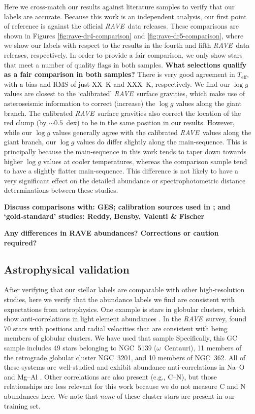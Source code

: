 \documentclass[preprint,trackchanges]{aastex}
\newcommand{\acronym}[1]{{\small{#1}}}
\newcommand{\project}[1]{\textsl{#1}}
\newcommand{\rave}{\project{\acronym{RAVE}}}
\newcommand{\stub}[1]{{\color{blue} \textbf{#1}}}
\newcommand{\teff}{T_{\mathrm{eff}}}
\newcommand{\logg}{\log g}
\begin{document}
Here we cross-match our results against literature samples to verify that
our labels are accurate.  Because this work is an independent analysis, our
first point of reference is against the official \rave\ data releases.  These
comparisons are shown in Figures \ref{fig:rave-dr4-comparison} and 
\ref{fig:rave-dr5-comparison}, where we show our labels with respect to the
results in the fourth and fifth \rave\ data releases, respectively.  In order
to provide a fair comparison, we only show stars that meet a number of quality
flags in both samples. 
\stub{What selections qualify as a fair comparison in both samples?}
There is very good agreement in $\teff$, with a bias
and RMS of just XX~K and XXX~K, respectively.  We find our $\logg$ values are
closest to the `calibrated' \rave\ surface gravities, which make use of 
asteroseismic information to correct (increase) the $\logg$ values along the
giant branch.  The calibrated \rave\ surface gravities also correct the 
location of the red clump (by $\sim0.5$~dex) to be in the same position in our
results.  However, while our $\logg$ values generally agree with the calibrated
\rave\ values along the giant branch, our $\logg$ values do differ slightly 
along the main-sequence.  This is principally because the main-sequence in 
this work tends to taper down towards higher $\logg$ values at cooler 
temperatures, whereas the comparison sample tend to have a slightly flatter
main-sequence.  This difference is not likely to have a very significant 
effect on the detailed abundance or spectrophotometric distance determinations
between these studies.

\stub{Discuss comparisons with: GES; calibration sources used in \citet{Kordopatis_2013}; and `gold-standard' studies: Reddy, Bensby, Valenti \& Fischer}

\stub{Any differences in RAVE abundances? Corrections or caution required?}


\subsection{Astrophysical validation}
\label{sec:astrophysical-validation}


After verifying that our stellar labels are comparable with other
high-resolution studies, here we verify that the abundance labels we find
are consistent with expectations from astrophysics.  One example is stars in
globular clusters, which show anti-correlations in light element abundances 
\citep[e.g.,][and references therein]{Da_Costa,Carretta_2009}. In the \rave\
survey, \cite{Anguiano_2015} found 70 stars with positions and radial velocities that are
consistent with being members of globular clusters.  We have used that sample
Specifically, this GC sample includes 49 stars belonging to NGC~5139 ($\omega$~Centauri), 11 members of the retrograde
globular cluster NGC~3201, and 10 members of NGC~362.  
All of these systems are well-studied and exhibit abundance anti-correlations 
in Na--O and Mg--Al \citep{people}.  Other correlations are also present 
(e.g., C--N), but those relationships are less relevant for this work because 
we do not measure C and N abundances here.  We note that \emph{none} of these 
cluster stars are present in our training set.
\end{document}
